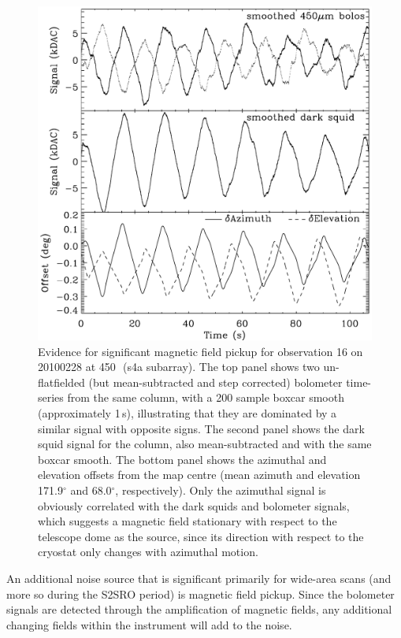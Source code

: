 \documentclass[useAMS,usenatbib,nofootinbib]{mn2e}
\begin{document}
\begin{figure}
\centering
\includegraphics[width=\linewidth]{magpickup}
\caption{Evidence for significant magnetic field pickup for
  observation 16 on 20100228 at 450\,\micron\ (s4a subarray).  The top
  panel shows two un-flatfielded (but mean-subtracted and step
  corrected) bolometer time-series from the same column, with a 200
  sample boxcar smooth (approximately 1\,s), illustrating that they
  are dominated by a similar signal with opposite signs. The second
  panel shows the dark squid signal for the column, also
  mean-subtracted and with the same boxcar smooth. The bottom panel
  shows the azimuthal and elevation offsets from the map centre (mean
  azimuth and elevation 171.9$^\circ$ and 68.0$^\circ$,
  respectively). Only the azimuthal signal is obviously correlated
  with the dark squids and bolometer signals, which suggests a
  magnetic field stationary with respect to the telescope dome as the
  source, since its direction with respect to the cryostat only
  changes with azimuthal motion.}
\label{fig:magpickup}
\end{figure}

An additional noise source that is significant primarily for wide-area
scans (and more so during the S2SRO period) is magnetic field
pickup. Since the bolometer signals are detected through the
amplification of magnetic fields, any additional changing fields
within the instrument will add to the noise.
\end{document}

